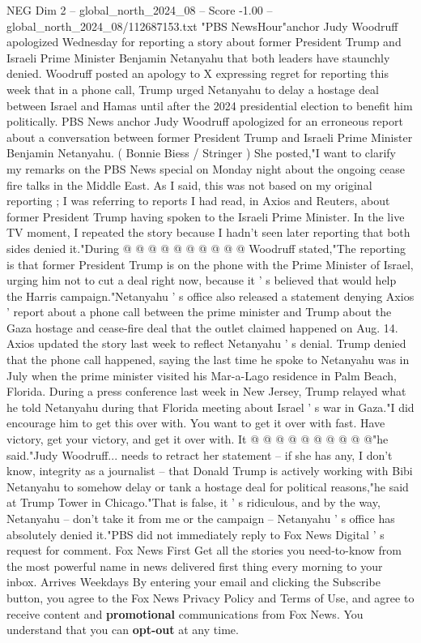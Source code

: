 \begin{textsample}{NEG Dim 2 – global\_north\_2024\_08 – Score -1.00 – global\_north\_2024\_08/112687153.txt}  \label{ex:f2_neg_051}
"PBS NewsHour"anchor Judy Woodruff apologized Wednesday for reporting a story about former President Trump and Israeli Prime Minister Benjamin Netanyahu that both leaders have staunchly denied.
Woodruff posted an apology to X expressing regret for reporting this week that in a phone call, Trump urged Netanyahu to delay a hostage deal between Israel and Hamas until after the 2024 presidential election to benefit him politically.
PBS News anchor Judy Woodruff apologized for an erroneous report about a conversation between former President Trump and Israeli Prime Minister Benjamin Netanyahu. ( Bonnie Biess / Stringer ) She posted,"I want to clarify my remarks on the PBS News special on Monday night about the ongoing cease fire talks in the Middle East.
As I said, this was not based on my original reporting ; I was referring to reports I had read, in Axios and Reuters, about former President Trump having spoken to the Israeli Prime Minister.
In the live TV moment, I repeated the story because I hadn't seen later reporting that both sides denied it."During @ @ @ @ @ @ @ @ @ @ Woodruff stated,"The reporting is that former President Trump is on the phone with the Prime Minister of Israel, urging him not to cut a deal right now, because it ' s believed that would help the Harris campaign."Netanyahu ' s office also released a statement denying Axios ' report about a phone call between the prime minister and Trump about the Gaza hostage and cease-fire deal that the outlet claimed happened on Aug. 14.
Axios updated the story last week to reflect Netanyahu ' s denial.
Trump denied that the phone call happened, saying the last time he spoke to Netanyahu was in July when the prime minister visited his Mar-a-Lago residence in Palm Beach, Florida.
During a press conference last week in New Jersey, Trump relayed what he told Netanyahu during that Florida meeting about Israel ' s war in Gaza."I did encourage him to get this over with.
You want to get it over with fast.
Have victory, get your victory, and get it over with.
It @ @ @ @ @ @ @ @ @ @"he said."Judy Woodruff... needs to retract her statement -- if she has any, I don't know, integrity as a journalist -- that Donald Trump is actively working with Bibi Netanyahu to somehow delay or tank a hostage deal for political reasons,"he said at Trump Tower in Chicago."That is false, it ' s ridiculous, and by the way, Netanyahu -- don't take it from me or the campaign -- Netanyahu ' s office has absolutely denied it."PBS did not immediately reply to Fox News Digital ' s request for comment.
Fox News First Get all the stories you need-to-know from the most powerful name in news delivered first thing every morning to your inbox.
Arrives Weekdays By entering your email and clicking the Subscribe button, you agree to the Fox News Privacy Policy and Terms of Use, and agree to receive content and \textbf{promotional} communications from Fox News.
You understand that you can \textbf{opt-out} at any time.

\end{textsample}
